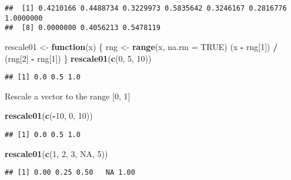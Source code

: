 \documentclass[
]{article}
\newenvironment{Shaded}{\begin{snugshade}}{\end{snugshade}}
\newcommand{\AttributeTok}[1]{\textcolor[rgb]{0.13,0.29,0.53}{#1}}
\newcommand{\ConstantTok}[1]{\textcolor[rgb]{0.56,0.35,0.01}{#1}}
\newcommand{\ControlFlowTok}[1]{\textcolor[rgb]{0.13,0.29,0.53}{\textbf{#1}}}
\newcommand{\DecValTok}[1]{\textcolor[rgb]{0.00,0.00,0.81}{#1}}
\newcommand{\FunctionTok}[1]{\textcolor[rgb]{0.13,0.29,0.53}{\textbf{#1}}}
\newcommand{\NormalTok}[1]{#1}
\newcommand{\OtherTok}[1]{\textcolor[rgb]{0.56,0.35,0.01}{#1}}
\newcommand{\SpecialCharTok}[1]{\textcolor[rgb]{0.81,0.36,0.00}{\textbf{#1}}}
\begin{document}
\begin{verbatim}
##  [1] 0.4210166 0.4488734 0.3229973 0.5835642 0.3246167 0.2816776 1.0000000
##  [8] 0.0000000 0.4056213 0.5478119
\end{verbatim}

\begin{Shaded}
\begin{Highlighting}[]
\NormalTok{rescale01 }\OtherTok{\textless{}{-}} \ControlFlowTok{function}\NormalTok{(x) \{}
\NormalTok{  rng }\OtherTok{\textless{}{-}} \FunctionTok{range}\NormalTok{(x, }\AttributeTok{na.rm =} \ConstantTok{TRUE}\NormalTok{)}
\NormalTok{  (x }\SpecialCharTok{{-}}\NormalTok{ rng[}\DecValTok{1}\NormalTok{]) }\SpecialCharTok{/}\NormalTok{ (rng[}\DecValTok{2}\NormalTok{] }\SpecialCharTok{{-}}\NormalTok{ rng[}\DecValTok{1}\NormalTok{])}
\NormalTok{\}}
\FunctionTok{rescale01}\NormalTok{(}\FunctionTok{c}\NormalTok{(}\DecValTok{0}\NormalTok{, }\DecValTok{5}\NormalTok{, }\DecValTok{10}\NormalTok{))}
\end{Highlighting}
\end{Shaded}

\begin{verbatim}
## [1] 0.0 0.5 1.0
\end{verbatim}

Rescale a vector to the range {[}0, 1{]}

\begin{Shaded}
\begin{Highlighting}[]
\FunctionTok{rescale01}\NormalTok{(}\FunctionTok{c}\NormalTok{(}\SpecialCharTok{{-}}\DecValTok{10}\NormalTok{, }\DecValTok{0}\NormalTok{, }\DecValTok{10}\NormalTok{))}
\end{Highlighting}
\end{Shaded}

\begin{verbatim}
## [1] 0.0 0.5 1.0
\end{verbatim}

\begin{Shaded}
\begin{Highlighting}[]
\FunctionTok{rescale01}\NormalTok{(}\FunctionTok{c}\NormalTok{(}\DecValTok{1}\NormalTok{, }\DecValTok{2}\NormalTok{, }\DecValTok{3}\NormalTok{, }\ConstantTok{NA}\NormalTok{, }\DecValTok{5}\NormalTok{))}
\end{Highlighting}
\end{Shaded}

\begin{verbatim}
## [1] 0.00 0.25 0.50   NA 1.00
\end{verbatim}
\end{document}
